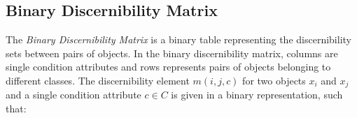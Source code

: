\documentclass[authoryear,preprint,review,12pt]{elsarticle}
\begin{document}
%
%
%  
%  
\subsection{Binary Discernibility Matrix}
  The \textit{Binary Discernibility Matrix} is a binary table representing the discernibility sets between pairs 
  of objects. 
  In the binary discernibility matrix, columns are single condition attributes and rows represents pairs of objects belonging to different classes. The discernibility element $m(i, j, c)$ for two objects $x_i$ and $x_j$ and a single condition attribute $c \in C$ is given in a binary representation, such that:
  
\end{document}
